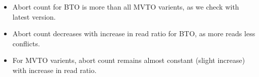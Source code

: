 \documentclass[12pt]{article}
\begin{document}
\begin{itemize}
    \item Abort count for BTO is more than all MVTO varients, as we check with latest version.
    \item Abort count decreases with increase in read ratio for BTO, as more reads less conflicts.
    \item For MVTO varients, abort count remains almost constant (slight increase) with increase in read ratio.
\end{itemize}
\end{document}
